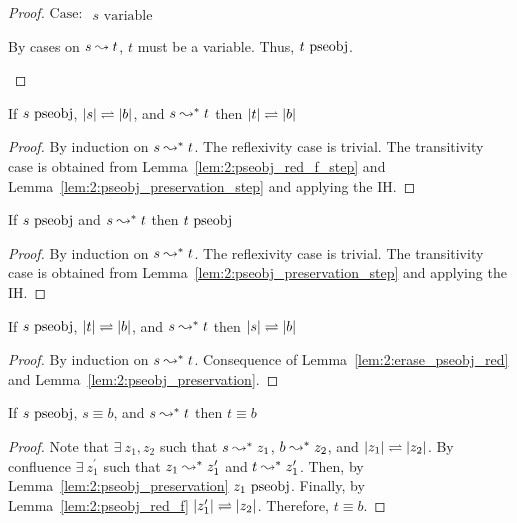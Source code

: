 \begin{proof}
    $\text{Case: }\begin{array}{c} s\text{ variable} \end{array}$
    \begin{proofcase}
        By cases on $s \leadsto t$, $t$ must be a variable.
        Thus, $t~\mbox{\normalfont pseobj}$.
    \end{proofcase}
\end{proof}

\begin{lemma}
    If $s~\mbox{\normalfont pseobj}$, $|s| \rightleftharpoons |b|$, and $s \leadsto^* t$ then $|t| \rightleftharpoons |b|$
    \label{lem:2:pseobj_red_f}
\end{lemma}
\begin{proof}
    By induction on $s \leadsto^* t$.
    The reflexivity case is trivial.
    The transitivity case is obtained from Lemma~\ref{lem:2:pseobj_red_f_step} and Lemma~\ref{lem:2:pseobj_preservation_step}
    and applying the IH.
\end{proof}

\begin{theorem}
    If $s~\mbox{\normalfont pseobj}$ and $s \leadsto^* t$ then $t~\mbox{\normalfont pseobj}$
    \label{lem:2:pseobj_preservation}
\end{theorem}
\begin{proof}
    By induction on $s \leadsto^* t$.
    The reflexivity case is trivial.
    The transitivity case is obtained from Lemma~\ref{lem:2:pseobj_preservation_step} and applying the IH.
\end{proof}

\begin{lemma}
    If $s~\mbox{\normalfont pseobj}$, $|t| \rightleftharpoons |b|$, and $s \leadsto^* t$ then $|s| \rightleftharpoons |b|$
    \label{lem:2:pseobj_red_b}
\end{lemma}
\begin{proof}
    By induction on $s \leadsto^* t$.
    Consequence of Lemma~\ref{lem:2:erase_pseobj_red} and Lemma~\ref{lem:2:pseobj_preservation}.
\end{proof}

\begin{lemma}
    If $s~\mbox{\normalfont pseobj}$, $s \equiv b$, and $s \leadsto^* t$ then $t \equiv b$
    \label{lem:2:conv_red_f}
\end{lemma}
\begin{proof}
    Note that $\exists\ z_1, z_2$ such that $s \leadsto^* z_1$, $b \leadsto^* z_2$, and $|z_1| \rightleftharpoons |z_2|$.
    By confluence $\exists\ z_1^\prime$ such that $z_1 \leadsto^* z_1^\prime$ and $t \leadsto^* z_1^\prime$.
    Then, by Lemma~\ref{lem:2:pseobj_preservation} $z_1~\mbox{\normalfont pseobj}$.
    Finally, by Lemma~\ref{lem:2:pseobj_red_f} $|z_1^\prime| \rightleftharpoons |z_2|$.
    Therefore, $t \equiv b$.
\end{proof}

